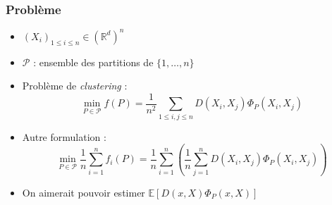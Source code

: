 \documentclass[a4paper]{beamer}
\begin{document}
\begin{frame}
    \frametitle{Problème}

    \begin{itemize}
        \item $(X_i)_{1 \leq i \leq n} \in (\mathbb{R}^d)^n$
        \item $\mathcal{P}$ : ensemble des partitions de $\{1, \ldots, n\}$
        \item Problème de \emph{clustering} :
        \[
                \min_{P \in \mathcal{P}} f(P) = \frac{1}{n^2} \sum_{1 \leq i,j \leq n}
                D(X_i, X_j) \Phi_P(X_i,X_j)
            \]
        \item Autre formulation :
            \[
                \min_{P \in \mathcal{P}} \frac{1}{n} \sum_{i=1}^n f_i(P)
                = \frac{1}{n} \sum_{i=1}^n \left( \frac{1}{n}
                \sum_{j=1}^n D(X_i, X_j) \Phi_P(X_i,X_j) \right)
            \]

        \item On aimerait pouvoir estimer
            $\mathbb{E}\left[ D(x, X) \Phi_P(x, X) \right]$
    \end{itemize}
\end{frame}
\end{document}

